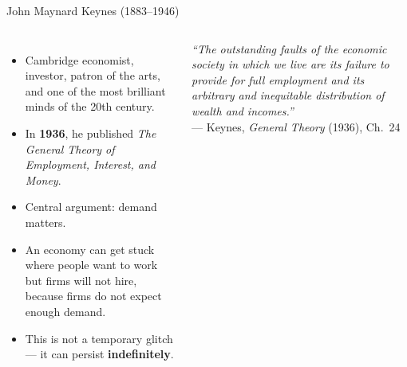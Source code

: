 \documentclass[aspectratio=169, 10pt]{beamer}
\begin{document}
\begin{frame}{John Maynard Keynes (1883--1946)}
\begin{columns}[T]
\begin{itemize}
  \item Cambridge economist, investor, patron of the arts,
        and one of the most brilliant minds of the 20th century.
  \item In \textbf{1936}, he published \textit{The General Theory of
        Employment, Interest, and Money}.
  \item Central argument: \alert{demand matters}.
  \item An economy can get stuck where people want to work but firms
        will not hire, because firms do not expect enough demand.
  \item This is not a temporary glitch --- it can persist \textbf{indefinitely}.
\end{itemize}
\begin{center}
\textit{``The outstanding faults of the economic society in which we live
are its failure to provide for full employment and its arbitrary and
inequitable distribution of wealth and incomes.''}\\[6pt]
--- Keynes, \textit{General Theory} (1936), Ch.~24
\end{center}
\end{columns}
\end{frame}
\end{document}
